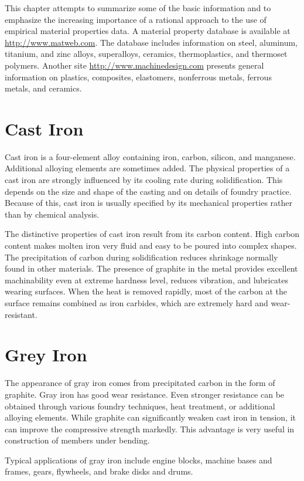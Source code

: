 \documentclass[a4paper,openany,12pt]{book}
\begin{document}
This chapter attempts to summarize some of the basic information and to
emphasize the increasing importance of a rational approach to the use of
empirical material properties data. A material property database is
available at \url{http://www.matweb.com}. The database includes
information on steel, aluminum, titanium, and zinc alloys, superalloys,
ceramics, thermoplastics, and thermoset polymers. Another site
\url{http://www.machinedesign.com} presents general information on
plastics, composites, elastomers, nonferrous metals, ferrous metals, and
ceramics.

\section{Cast Iron}
\label{sec:org3cbd028}
Cast iron is a four-element alloy containing iron, carbon, silicon, and
manganese. Additional alloying elements are sometimes added. The
physical properties of a cast iron are strongly influenced by its
cooling rate during solidification. This depends on the size and shape
of the casting and on details of foundry practice. Because of this, cast
iron is usually specified by its mechanical properties rather than by
chemical analysis.

The distinctive properties of cast iron result from its carbon content.
High carbon content makes molten iron very fluid and easy to be poured
into complex shapes. The precipitation of carbon during solidification
reduces shrinkage normally found in other materials. The presence of
graphite in the metal provides excellent machinability even at extreme
hardness level, reduces vibration, and lubricates wearing surfaces. When
the heat is removed rapidly, most of the carbon at the surface remains
combined as iron carbides, which are extremely hard and wear-resistant.

\section{Grey Iron}
\label{sec:orgf8d50d1}
The appearance of gray iron comes from precipitated carbon in the form
of graphite. Gray iron has good wear resistance. Even stronger
resistance can be obtained through various foundry techniques, heat
treatment, or additional alloying elements. While graphite can
significantly weaken cast iron in tension, it can improve the
compressive strength markedly. This advantage is very useful in
construction of members under bending.

Typical applications of gray iron include engine blocks, machine bases
and frames, gears, flywheels, and brake disks and drums.
\end{document}
